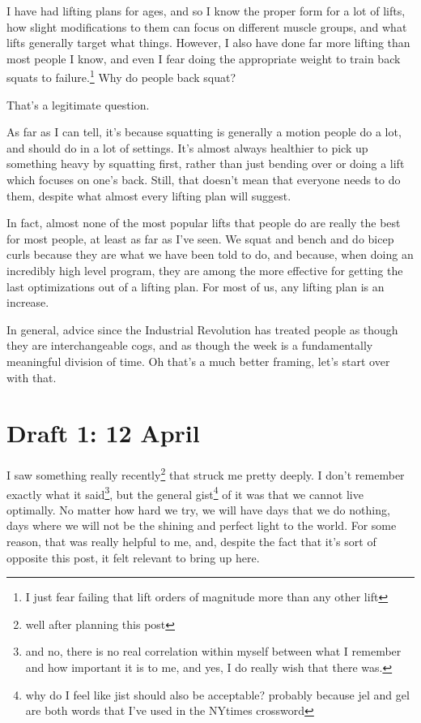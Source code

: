 \documentclass[12pt]{article}
\renewcommand{\,}{\textsuperscript{,}}
\begin{document}
I have had lifting plans for ages, and so I know the proper form for a lot of lifts, how slight modifications to them can focus on different muscle groups, and what lifts generally target what things.  
However, I also have done far more lifting than most people I know, and even I fear doing the appropriate weight to train back squats to failure.\footnote{I just fear failing that lift orders of magnitude more than any other lift}  
Why do people back squat?

That's a legitimate question.

As far as I can tell, it's because squatting is generally a motion people do a lot, and should do in a lot of settings.  
It's almost always healthier to pick up something heavy by squatting first, rather than just bending over or doing a lift which focuses on one's back.  
Still, that doesn't mean that everyone needs to do them, despite what almost every lifting plan will suggest.

In fact, almost none of the most popular lifts that people do are really the best for most people, at least as far as I've seen.  
We squat and bench and do bicep curls because they are what we have been told to do, and because, when doing an incredibly high level program, they are among the more effective for getting the last optimizations out of a lifting plan.  
For most of us, any lifting plan is an increase.

In general, advice since the Industrial Revolution has treated people as though they are interchangeable cogs, and as though the week is a fundamentally meaningful division of time.  
Oh that's a much better framing, let's start over with that.

\section{Draft 1: 12 April}

I saw something really recently\footnote{well after planning this post} that struck me pretty deeply.  
I don't remember exactly what it said\footnote{and no, there is no real correlation within myself between what I remember and how important it is to me, and yes, I do really wish that there was.}, but the general gist\footnote{why do I feel like jist should also be acceptable? probably because jel and gel are both words that I've used in the NYtimes crossword} of it was that we cannot live optimally.  
No matter how hard we try, we will have days that we do nothing, days where we will not be the shining and perfect light to the world.  
For some reason, that was really helpful to me, and, despite the fact that it's sort of opposite this post, it felt relevant to bring up here.
\end{document}
